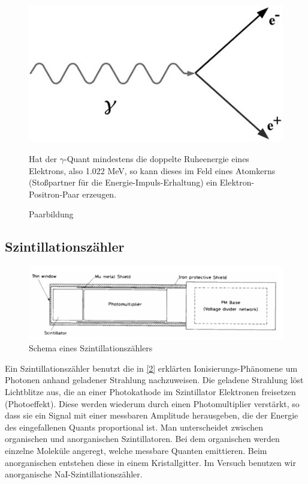 \begin{figure}[H]
	\begin{minipage}{0.49\textwidth}
	\centering \includegraphics[width=\textwidth]{BilderTheorie/Paarbildung.jpg}
	\caption{Paarbildung}
	\end{minipage}
	\begin{minipage}{0.49\textwidth}
	Hat der $\gamma$-Quant mindestens die doppelte Ruheenergie eines Elektrons, also 1.022 MeV, so kann dieses im Feld eines Atomkerns (Stoßpartner für die Energie-Impuls-Erhaltung) ein Elektron-Positron-Paar erzeugen. 
	\end{minipage}
\end{figure}


\subsection{Szintillationszähler}

\begin{figure}[H]
	\centering \includegraphics[width=\textwidth]{BilderTheorie/Szinti.png}
	\caption{Schema eines Szintillationszählers}
\end{figure}

Ein Szintillationszähler benutzt die in \ref{2} erklärten Ionisierungs-Phänomene um Photonen anhand geladener Strahlung nachzuweisen. Die geladene Strahlung löst Lichtblitze aus, die an einer Photokathode im Szintillator Elektronen freisetzen (Photoeffekt). Diese werden wiederum durch einen Photomultiplier verstärkt, so dass sie ein Signal mit einer messbaren Amplitude herausgeben, die der Energie des eingefallenen Quants proportional ist. Man unterscheidet zwischen organischen und anorganischen Szintillatoren. Bei dem organischen werden einzelne Moleküle angeregt, welche messbare Quanten emittieren. Beim anorganischen entstehen diese in einem Kristallgitter. Im Versuch benutzen wir anorganische NaI-Szintillationszähler.

